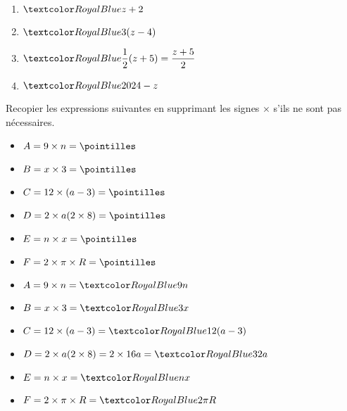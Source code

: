 \begin{Maquette}[Fiche,CorrigeFin,Colonnes=2]{}
\begin{multicols}{2}
      \begin{Solution}
         \begin{enumerate}
            \item $\cor{z+2}$
            \item $\cor{3(z-4)}$
            \item $\cor{\dfrac12(z+5) =\dfrac{z+5}{2}}$ \smallskip
            \item $\cor{2024-z}$
         \end{enumerate}
      \end{Solution}
      
      
      \begin{exercice}[SLF] %
         Recopier les expressions suivantes en supprimant les signes $\times$ s'ils ne sont pas nécessaires.
         \begin{itemize}
            \item $A =9\times n =\pointilles$ \medskip
            \item $B =x\times3 =\pointilles$ \medskip
            \item $C =12\times(a-3) =\pointilles$ \medskip
            \item $D =2\times a(2\times8) =\pointilles$ \medskip
            \item $E =n\times x =\pointilles$ \medskip
            \item $F =2\times\pi\times R =\pointilles$ \medskip
         \end{itemize}
      \end{exercice}
      
      \begin{Solution}
         \begin{itemize}
            \item $A =9\times n =\cor{9n}$
            \item $B =x\times3 =\cor{3x}$
            \item $C =12\times(a-3) =\cor{12(a-3)}$
            \item $D =2\times a(2\times8) =2\times16a =\cor{32a}$
            \item $E =n\times x =\cor{nx}$
            \item $F =2\times\pi\times R =\cor{2\pi R}$
         \end{itemize}
      \end{Solution}


\end{multicols}
\end{Maquette}

